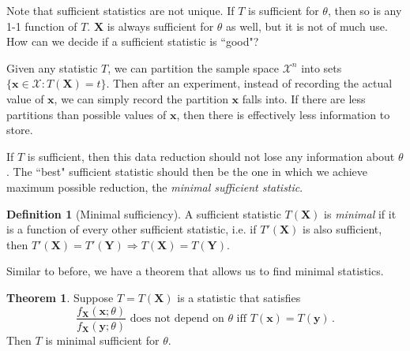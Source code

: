 \documentclass[a4paper,11pt]{article}
\theoremstyle{definition}
\newtheorem*{defn}{Definition}
\newtheorem*{thm}{Theorem}
\numberwithin{equation}{section}
\begin{document}
Note that sufficient statistics are not unique. If $T$ is sufficient for $\theta$, then so is any 1-1 function of $T$. $\mathbf{X}$ is always sufficient for $\theta$ as well, but it is not of much use. How can we decide if a sufficient statistic is ``good"?

Given any statistic $T$, we can partition the sample space $\mathcal{X}^n$ into sets $\{\mathbf{x}\in\mathcal{X}:T(\mathbf{X})=t\}$. Then after an experiment, instead of recording the actual value of $\mathbf{x}$, we can simply record the partition $\mathbf{x}$ falls into. If there are less partitions than possible values of $\mathbf{x}$, then there is effectively less information to store.

If $T$ is sufficient, then this data reduction should not lose any information about $\theta$. The ``best" sufficient statistic should then be the one in which we achieve maximum possible reduction, the \emph{minimal sufficient statistic}. 

\begin{defn}[Minimal sufficiency]
A sufficient statistic $T(\mathbf{X})$ is \emph{minimal} if it is a function of every other sufficient statistic, i.e. if $T'(\mathbf{X})$ is also sufficient, then $T'(\mathbf{X})=T'(\mathbf{Y})\Rightarrow T(\mathbf{X})=T(\mathbf{Y})$.
\end{defn}

Similar to before, we have a theorem that allows us to find minimal statistics.

\begin{thm}
Suppose $T=T(\mathbf{X})$ is a statistic that satisfies 
\[
\frac{f_\mathbf{X}(\mathbf{x};\theta)}{f_\mathbf{X}(\mathbf{y};\theta)}\text{ does not depend on }\theta
\text{ iff }T(\mathbf{x})=T(\mathbf{y})\,.
\]
Then $T$ is minimal sufficient for $\theta$.
\end{thm}
\end{document}
